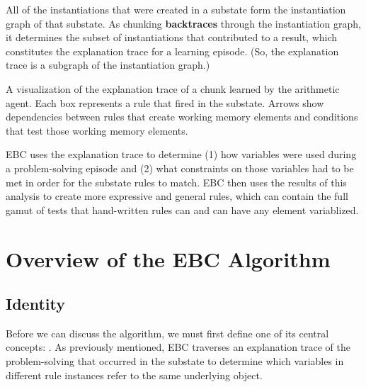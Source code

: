 All of the instantiations that were created in a substate form the instantiation graph of that substate.  As chunking \textbf{backtraces} through the instantiation graph, it determines the subset of instantiations that contributed to a result, which constitutes the explanation trace for a learning episode.  (So, the explanation trace is a subgraph of the instantiation graph.)

\vspace{12pt}
\begin{center}
	\captionsetup{type=figure}
	\centering{}
	\caption{A visualization of the explanation trace of a chunk learned by the arithmetic agent.  Each box represents a rule that fired in the substate.  Arrows show dependencies between rules that create working memory elements and conditions that test those working memory elements.}
	\label{fig:chunking-trace}
\end{center}

EBC uses the explanation trace to determine (1) how variables were used during a problem-solving episode and (2) what constraints on those variables had to be met in order for the substate rules to match.  EBC then uses the results of this analysis to create more expressive and general rules, which can contain the full gamut of tests that hand-written rules can and can have any element variablized.


\section{Overview of the EBC Algorithm}
\label{CHUNKING-ebc}

\subsection{Identity}

Before we can discuss the algorithm, we must first define one of its central concepts: .  As previously mentioned, EBC traverses an explanation trace of the problem-solving that occurred in the substate to determine which variables in different rule instances refer to the same underlying object.  

